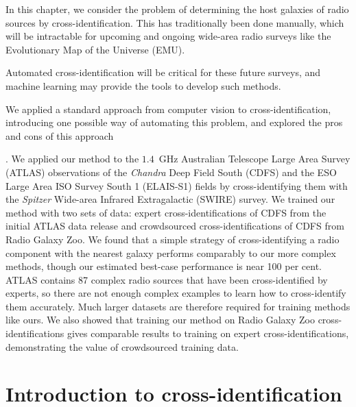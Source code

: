 \documentclass[11pt, a4paper]{book}
\providecommand{\DIFaddbegin}{} %
\providecommand{\DIFaddend}{} %
\newcommand{\DIFaddincludegraphics}[2][]{{\color{blue}\fbox{\DIFOincludegraphics[#1]{#2}}}} %
\DeclareRobustCommand{\DIFaddbegin}{\DIFOaddbegin \let\includegraphics\DIFaddincludegraphics} %
\DeclareRobustCommand{\DIFaddend}{\DIFOaddend \let\includegraphics\DIFOincludegraphics} %
\begin{document}
In this chapter, we consider the problem of determining the host galaxies of radio sources by cross-identification. This has traditionally been done manually, which will be intractable for upcoming and ongoing wide-area radio surveys like the Evolutionary Map of the Universe (EMU). {Automated cross-identification will be critical for these future surveys, and machine learning may provide the tools to develop such methods.
\DIFaddbegin 

\DIFaddend We applied a standard approach from computer vision to cross-identification, introducing one possible way of automating this problem, and explored the pros and cons of this approach}. We applied our method to the $1.4$~GHz Australian Telescope Large Area Survey (ATLAS) observations of the \emph{Chandra} Deep Field South (CDFS) and the ESO Large Area ISO Survey South 1 (ELAIS-S1) fields by cross-identifying them with the \emph{Spitzer} Wide-area Infrared Extragalactic (SWIRE) survey. We trained our method with two sets of data: expert cross-identifications of CDFS from the initial ATLAS data release and crowdsourced cross-identifications of CDFS from Radio Galaxy Zoo. {We found that a simple strategy of cross-identifying a radio component with the nearest galaxy performs comparably to our more complex methods, though our estimated best-case performance is near 100 per cent. ATLAS contains 87 complex radio sources that have been cross-identified by experts, so there are not enough complex examples to learn how to cross-identify them accurately. Much larger datasets are therefore required for training methods like ours. We also showed that training our method on Radio Galaxy Zoo cross-identifications gives comparable results to training on expert cross-identifications, demonstrating the value of crowdsourced training data.}

\section{Introduction to cross-identification}
\label{sec:atlas-xid-intro-cross-id}
\end{document}

